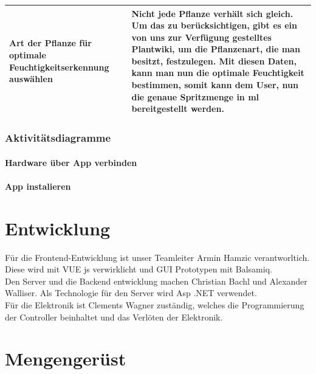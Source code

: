 \documentclass[12pt]{article}
\theoremstyle{definition}
\begin{document}
\begin{center}
\begin{tabular}{| L{3cm} | C{12.3cm} |}

\hline
Art der Pflanze für optimale Feuchtigkeitserkennung auswählen & Nicht jede Pflanze verhält sich gleich. Um das zu berücksichtigen, gibt es ein von uns zur Verfügung gestelltes Plantwiki, um die Pflanzenart, die man besitzt, festzulegen. Mit diesen Daten, kann man nun die optimale Feuchtigkeit bestimmen, somit kann dem User, nun die genaue Spritzmenge in ml bereitgestellt werden. \\
\hline
\end{tabular}
\end{center}
\pagebreak
\subsubsection{Aktivitätsdiagramme}
\paragraph{Hardware über App verbinden}
\begin{center}

\end{center}

\paragraph{App instalieren}
\begin{center}

\end{center}

\pagebreak
\section{Entwicklung}
Für die Frontend-Entwicklung ist unser Teamleiter Armin Hamzic verantworltich. Diese wird mit VUE js verwirklicht und GUI Prototypen mit Balsamiq.\\
Den Server und die Backend entwicklung machen Christian Bachl und Alexander Walliser. Als Technologie für
den Server wird Asp .NET verwendet.\\
Für die Elektronik ist Clements Wagner zuständig, welches die Programmierung der Controller beinhaltet und das Verlöten der Elektronik.

\section{Mengengerüst}
\end{document}

